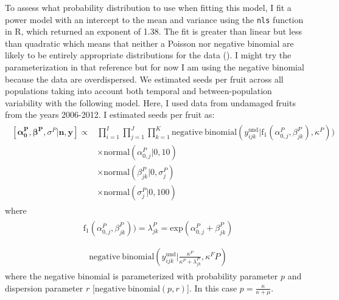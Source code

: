 \documentclass[12pt, oneside, titlepage]{article}   	%
\begin{document}
To assess what probability distribution to use when fitting this model, I fit a power model with an intercept to the mean and variance using the \verb|nls| function in R, which returned an exponent of 1.38. The fit is greater than linear but less than quadratic which means that neither a Poisson nor negative binomial are likely to be entirely appropriate distributions for the data (\cite{linden2011}). I might try the parameterization in that reference but for now I am using the negative binomial because the data are overdispersed. We estimated seeds per fruit across all populations taking into account both temporal and between-population variability with the following model. Here, I used data from undamaged fruits from the years 2006-2012. I estimated seeds per fruit as: 
%
\begin{align}
  \begin{split}
 [ \bm{\alpha^P_0}, \bm{\beta^P}, \sigma^P | \bm{n}, \bm{y} ] \propto 
 & \prod_{i=1}^{I} \prod_{j=1}^{J} \prod_{k=1}^{K}  \mathrm{negative \ binomial} ( y^{\mathrm{und}}_{ijk} | \mathrm{f}_1(\alpha^P_{0,j} , \beta^P_{jk} ), \kappa^P ) )
     \\ & \times \mathrm{normal} ( \alpha^P_{0,j} | 0, 10)  
     \\ & \times \mathrm{normal} ( \beta^P_{jk} | 0, \sigma^P_j) 
    \\ & \times \mathrm{normal} ( \sigma^P_j | 0, 100)  
   \end{split}
\end{align}
%
where
%
\begin{align}
  \begin{split}
\mathrm{f}_1(\alpha^P_{0,j} , \beta^P_{jk} ) ) = \lambda^P_{jk} = \mathrm{exp}( \alpha^P_{0,j} + \beta^P_{jk} ) \\
  \end{split}
\end{align}
%
\begin{align}
  \begin{split}
  \mathrm{negative \ binomial} ( y^{\mathrm{und}}_{ijk} | \frac{\kappa^P}{\kappa^P + \lambda^P_{jk}} ,  \kappa^FP)
  \end{split}
\end{align}
%
where the negative binomial is parameterized with probability parameter $p$ and dispersion parameter $r$ [$ \mathrm{negative \ binomial}(p,r)$]. In this case $p=\frac{\kappa}{\kappa+\mu}$.
\end{document}
